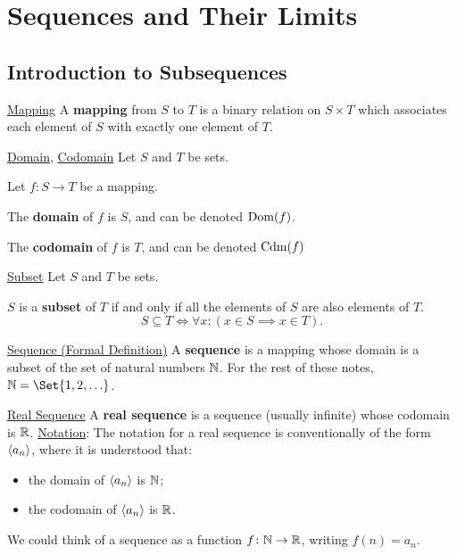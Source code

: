 \section{Sequences and Their Limits}
\subsection{Introduction to Subsequences}
\begin{Definition}{\href{https://proofwiki.org/wiki/Definition:Mapping\#Definition_1}{Mapping}}{}
    A \textbf{mapping} from $ S $ to $ T $ is a binary relation
    on $ S\times T $ which associates each element of $ S $ with exactly one element of $ T $.
\end{Definition}
\begin{Definition}{
        \href{https://proofwiki.org/wiki/Definition:Domain_(Relation_Theory)/Mapping}{Domain},
        \href{https://proofwiki.org/wiki/Definition:Codomain_(Relation_Theory)/Mapping}{Codomain}
    }{}
    Let $ S $ and $ T $ be sets.\smallskip

    Let $ f\colon S\to T $ be a mapping.\bigskip

    The \textbf{domain} of $ f $ is $ S $, and can be denoted $ \operatorname{Dom}(f) $.\smallskip

    The \textbf{codomain} of $ f $ is $ T $, and can be denoted $ \operatorname{Cdm}(f) $
\end{Definition}
\begin{Definition}{\href{https://proofwiki.org/wiki/Definition:Subset}{Subset}}{}
    Let $ S $ and $ T $ be sets.\bigskip

    $ S $ is a \textbf{subset} of $ T $ if and only if all the elements of $ S $ are also elements of $ T $.
    \[ S\subseteq T\iff \forall x:(x\in S\implies x\in T). \]
\end{Definition}
\begin{Definition}{\href{https://proofwiki.org/wiki/Definition:Sequence\#Formal_Definition}{Sequence (Formal Definition)}}{}
    A \textbf{sequence} is a mapping whose domain is a subset of the set of natural numbers $ \mathbb{N} $. For the rest of these notes,
    $ \N=\Set{1,2,\ldots} $.
\end{Definition}
\begin{Definition}{\href{https://proofwiki.org/wiki/Definition:Real_Sequence}{Real Sequence}}{}
    A \textbf{real sequence} is a sequence (usually infinite) whose codomain is $ \mathbb{R} $.
    \tcblower{}
    \underline{Notation}: The notation for a real sequence is conventionally of the form
    $ \langle a_n\rangle $, where it is understood that:
    \begin{itemize}
        \item the domain of $ \langle a_n\rangle $ is $ \mathbb{N} $;
        \item the codomain of $ \langle a_n\rangle $ is $ \mathbb{R} $.
    \end{itemize}
    We could think of a sequence as a function $ f\colon \mathbb{N}\to\mathbb{R} $, writing $ f(n)=a_n $.
\end{Definition}
